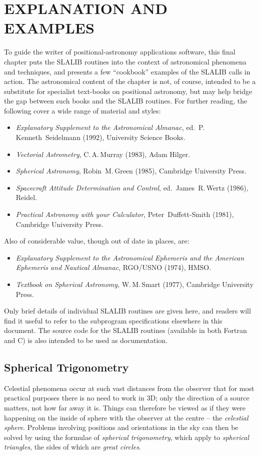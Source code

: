 \documentclass[11pt,twoside]{article}
\begin{document}
\section{EXPLANATION AND EXAMPLES}
To guide the writer of positional-astronomy applications software,
this final chapter puts the SLALIB routines into the context of
astronomical phenomena and techniques, and presents a few
``cookbook'' examples
of the SLALIB calls in action.  The astronomical content of the chapter
is not, of course, intended to be a substitute for specialist text-books on
positional astronomy, but may help bridge the gap between
such books and the SLALIB routines.  For further reading, the following
cover a wide range of material and styles:
\begin{itemize}
\item {\it Explanatory Supplement to the Astronomical Almanac},
      ed.\ P.\,Kenneth~Seidelmann (1992), University Science Books.
\item {\it Vectorial Astrometry}, C.\,A.\,Murray (1983), Adam Hilger.
\item {\it Spherical Astronomy}, Robin~M.\,Green (1985), Cambridge
      University Press.
\item {\it Spacecraft Attitude Determination and Control},
      ed.\ James~R.\,Wertz (1986), Reidel.
\item {\it Practical Astronomy with your Calculator},
      Peter~Duffett-Smith (1981), Cambridge University Press.
\end{itemize}
Also of considerable value, though out of date in places, are:
\begin{itemize}
\item {\it Explanatory Supplement to the Astronomical Ephemeris
      and the American Ephemeris and Nautical Almanac}, RGO/USNO (1974),
      HMSO.
\item {\it Textbook on Spherical Astronomy}, W.\,M.\,Smart (1977),
      Cambridge University Press.
\end{itemize}
Only brief details of individual SLALIB routines are given here, and
readers will find it useful to refer to the subprogram specifications
elsewhere in this document.  The source code for the SLALIB routines
(available in both Fortran and C) is also intended to be used as
documentation.

\subsection {Spherical Trigonometry}
Celestial phenomena occur at such vast distances from the
observer that for most practical purposes there is no need to
work in 3D;  only the direction
of a source matters, not how far away it is.  Things can
therefore be viewed as if they were happening
on the inside of sphere with the observer at the centre --
the {\it celestial sphere}.  Problems involving
positions and orientations in the sky can then be solved by
using the formulae of {\it spherical trigonometry}, which
apply to {\it spherical triangles}, the sides of which are
{\it great circles}.
\end{document}
